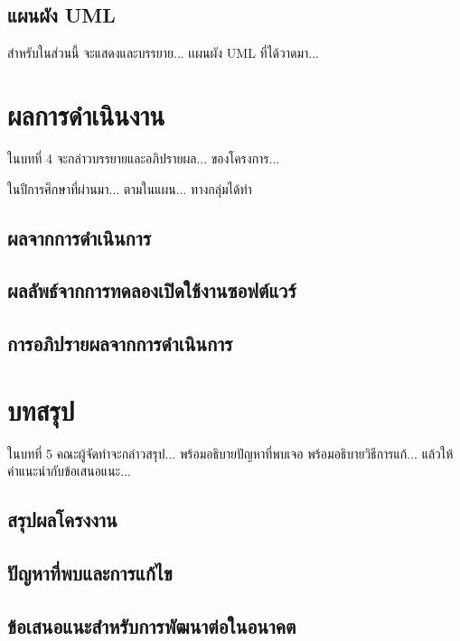 \documentclass[12pt,one side,openright,a4paper]{cpe-thesis-th}
\newcommand{\thaijustify}[1]{%
  \par\hspace{30pt}\justifying
  #1
}
\begin{document}
\section{แผนผัง UML}
    \thaijustify{
        สำหรับในส่วนนี้ จะแสดงและบรรยาย... เเผนผัง UML ที่ได้วาดมา...
    }
\pagebreak


\chapter{ผลการดำเนินงาน}
\thaijustify{
    ในบทที่ 4 จะกล่าวบรรยายและอภิปรายผล... ของโครงการ...
}
\thaijustify{
    ในปีการศึกษาที่ผ่านมา... ตามในแผน... ทางกลุ่มได้ทำ
}
\section{ผลจากการดำเนินการ}

\pagebreak
\section{ผลลัพธ์จากการทดลองเปิดใช้งานซอฟต์แวร์}
   
\pagebreak
\section{การอภิปรายผลจากการดำเนินการ}

\pagebreak


\chapter{บทสรุป}
    ในบทที่ 5 คณะผู้จัดทำจะกล่าวสรุป... พร้อมอธิบายปัญหาที่พบเจอ พร้อมอธิบายวิธีการแก้... แล้วให้คำแนะนำกับข้อเสนอแนะ...
\section{สรุปผลโครงงาน}

\pagebreak
\section{ปัญหาที่พบและการแก้ไข}

\pagebreak
\section{ข้อเสนอแนะสำหรับการพัฒนาต่อในอนาคต}
\end{document}
